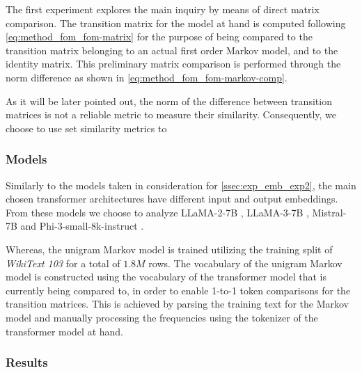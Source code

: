 The first experiment explores the main inquiry by means of direct matrix comparison.
The transition matrix for the model at hand is computed following \cref{eq:method_fom_fom-matrix} for the purpose of being compared to the transition matrix belonging to an actual first order Markov model, and to the identity matrix.
This preliminary matrix comparison is performed through the norm difference as shown in \cref{eq:method_fom_fom-markov-comp}.

As it will be later pointed out, the norm of the difference between transition matrices is not a reliable metric to measure their similarity.
Consequently, we choose to use set similarity metrics to

\subsubsection{Models}

Similarly to the models taken in consideration for \cref{ssec:exp_emb_exp2}, the main chosen transformer architectures have different input and output embeddings.
From these models we choose to analyze LLaMA-2-7B , LLaMA-3-7B , Mistral-7B  and Phi-3-small-8k-instruct .

Whereas, the unigram Markov model is trained utilizing the training split of \emph{WikiText 103}  for a total of $1.8M$ rows.
The vocabulary of the unigram Markov model is constructed using the vocabulary of the transformer model that is currently being compared to, in order to enable 1-to-1 token comparisons for the transition matrices.
This is achieved by parsing the training text for the Markov model and manually processing the frequencies using the tokenizer of the transformer model at hand.


\subsubsection{Results}

